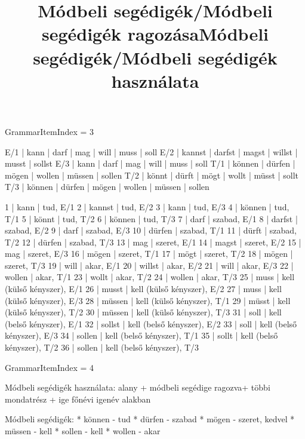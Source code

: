 \title{Módbeli segédigék/Módbeli segédigék ragozása}

GrammarItemIndex = 3

\begin{desc}
E/1 | kann   | darf   | mag   | will   | muss   | soll 
E/2 | kannst | darfst | magst | willst | musst  | sollst 
E/3 | kann   | darf   | mag   | will   | muss   | soll 
T/1 | können | dürfen | mögen | wollen | müssen | sollen 
T/2 | könnt  | dürft  | mögt  | wollt  | müsst  | sollt 
T/3 | können | dürfen | mögen | wollen | müssen | sollen 
\end{desc}

\begin{exmp}
1 | kann | tud, E/1
2 | kannst | tud, E/2
3 | kann | tud, E/3
4 | können | tud, T/1
5 | könnt | tud, T/2
6 | können | tud, T/3
7 | darf | szabad, E/1
8 | darfst | szabad, E/2
9 | darf | szabad, E/3
10 | dürfen | szabad, T/1
11 | dürft | szabad, T/2
12 | dürfen | szabad, T/3
13 | mag | szeret, E/1
14 | magst | szeret, E/2
15 | mag | szeret, E/3
16 | mögen | szeret, T/1
17 | mögt | szeret, T/2
18 | mögen | szeret, T/3
19 | will | akar, E/1
20 | willst | akar, E/2
21 | will | akar, E/3
22 | wollen | akar, T/1
23 | wollt | akar, T/2
24 | wollen | akar, T/3
25 | muss | kell (külső kényszer), E/1
26 | musst | kell (külső kényszer), E/2
27 | muss | kell (külső kényszer), E/3
28 | müssen | kell (külső kényszer), T/1
29 | müsst | kell (külső kényszer), T/2
30 | müssen | kell (külső kényszer), T/3
31 | soll | kell (belső kényszer), E/1
32 | sollst | kell (belső kényszer), E/2
33 | soll | kell (belső kényszer), E/3
34 | sollen | kell (belső kényszer), T/1
35 | sollt | kell (belső kényszer), T/2
36 | sollen | kell (belső kényszer), T/3
\end{exmp}

\title{Módbeli segédigék/Módbeli segédigék használata}

GrammarItemIndex = 4

\begin{desc}
Módbeli segédigék használata:
alany + módbeli segédige ragozva+ többi mondatrész + ige főnévi igenév alakban 

Módbeli segédigék:
* können - tud
* dürfen - szabad
* mögen - szeret, kedvel
* müssen - kell
* sollen - kell
* wollen - akar
\end{desc}

